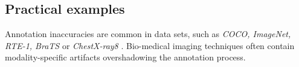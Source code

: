 \subsection{Practical examples}
Annotation inaccuracies are common in  data sets, such as \emph{COCO, ImageNet, RTE-1, BraTS} or \emph{ChestX-ray8} \citep{Ma_2022_CVPR,Yun_2021_CVPR,pmlr-v119-shankar20c,beyer2020we,klebanov2010some,kofler2021we,wang2017chestx}.
Bio-medical imaging techniques often contain modality-specific artifacts overshadowing the annotation process.





